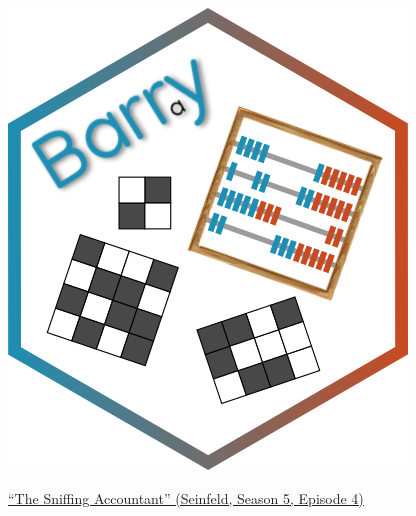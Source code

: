 \documentclass[aspectratio=169, 9pt]{beamer}
\begin{document}
\begin{frame}[c]
	\centering
	\includegraphics[width=.25\linewidth]{fig/barry-logo.png}
	
	
	
	\vfill\raggedright {\footnotesize \href{https://en.wikipedia.org/wiki/The_Sniffing_Accountant}{``The Sniffing Accountant'' (Seinfeld, Season 5, Episode 4)}}
\end{frame}
\end{document}
